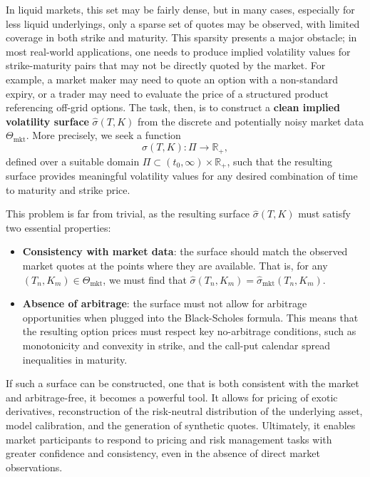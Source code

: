 In liquid markets, this set may be fairly dense, but in many cases, especially for less liquid underlyings, only a sparse set of quotes may be observed, with limited coverage in both strike and maturity.
This sparsity presents a major obstacle; in most real-world applications, one needs to produce implied volatility values for strike-maturity pairs that may not be directly quoted by the market.
For example, a market maker may need to quote an option with a non-standard expiry, or a trader may need to evaluate the price of a structured product referencing off-grid options.
The task, then, is to construct a \textbf{clean implied volatility surface} $\hat{\sigma}(T, K)$ from the discrete and potentially noisy market data $\Theta_{\text{mkt}}$.
More precisely, we seek a function
\[
    \hat{\sigma}(T, K): \Pi \to \mathbb{R}_+,
\]
defined over a suitable domain $\Pi \subset (t_0, \infty) \times \mathbb{R}_+$, such that the resulting surface provides meaningful volatility values for any desired combination of time to maturity and strike price.

This problem is far from trivial, as the resulting surface $\hat{\sigma}(T, K)$ must satisfy two essential properties:

\begin{itemize}
    \item \textbf{Consistency with market data}: the surface should match the observed market quotes at the points where they are available.
          That is, for any $(T_n, K_m) \in \Theta_{\text{mkt}}$, we must find that $\hat{\sigma}(T_n, K_m) = \hat{\sigma}_{\text{mkt}}(T_n, K_m)$.
    \item \textbf{Absence of arbitrage}: the surface must not allow for arbitrage opportunities when plugged into the Black-Scholes formula.
          This means that the resulting option prices must respect key no-arbitrage conditions, such as monotonicity and convexity in strike, and the call-put calendar spread inequalities in maturity.
\end{itemize}

If such a surface can be constructed, one that is both consistent with the market and arbitrage-free, it becomes a powerful tool.
It allows for pricing of exotic derivatives, reconstruction of the risk-neutral distribution of the underlying asset, model calibration, and the generation of synthetic quotes.
Ultimately, it enables market participants to respond to pricing and risk management tasks with greater confidence and consistency, even in the absence of direct market observations.

